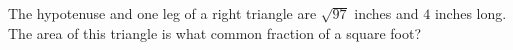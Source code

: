 The hypotenuse and one leg of a right triangle are $\sqrt{97}$ inches and $4$ inches long. The area of this triangle is what common fraction of a square foot?
